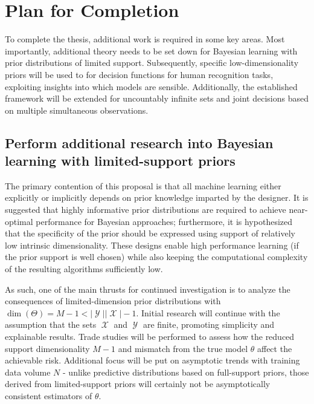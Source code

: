 \documentclass[12pt]{article}
\DeclareMathOperator{\Xcal}{\mathcal{X}}
\DeclareMathOperator{\Ycal}{\mathcal{Y}}
\begin{document}
\newpage
\section{Plan for Completion}

To complete the thesis, additional work is required in some key areas. Most importantly, additional theory needs to be set down for Bayesian learning with prior distributions of limited support. Subsequently, specific low-dimensionality priors will be used to for decision functions for human recognition tasks, exploiting insights into which models are sensible. Additionally, the established framework will be extended for uncountably infinite sets and joint decisions based on multiple simultaneous observations. 


\subsection{Perform additional research into Bayesian learning with limited-support priors}

The primary contention of this proposal is that all machine learning either explicitly or implicitly depends on prior knowledge imparted by the designer. It is suggested that highly informative prior distributions are required to achieve near-optimal performance for Bayesian approaches; furthermore, it is hypothesized that the specificity of the prior should be expressed using support of relatively low intrinsic dimensionality. These designs enable high performance learning (if the prior support is well chosen) while also keeping the computational complexity of the resulting algorithms sufficiently low. 

As such, one of the main thrusts for continued investigation is to analyze the consequences of limited-dimension prior distributions with $\dim(\Theta) = M-1 < |\Ycal||\Xcal| - 1$. Initial research will continue with the assumption that the sets $\Xcal$ and $\Ycal$ are finite, promoting simplicity and explainable results. Trade studies will be performed to assess how the reduced support dimensionality $M-1$ and mismatch from the true model $\theta$ affect the achievable risk. Additional focus will be put on asymptotic trends with training data volume $N$ - unlike predictive distributions based on full-support priors, those derived from limited-support priors will certainly not be asymptotically consistent estimators of $\theta$. 
\end{document}
